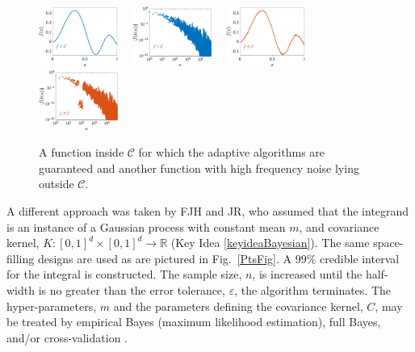 \documentclass[11pt]{NSFamsart}
\newcommand{\reals}{{\mathbb{R}}}
\newcommand{\cc}{\mathcal{C}}
\begin{document}
\begin{figure}[h]
	\centering
	\includegraphics[width = 0.23\textwidth] 
	{ProgramsImages/FunctionWalshFourierCoeffDecay.eps} \ \ 
	\includegraphics[width = 0.23\textwidth] 
	{ProgramsImages/WalshFourierCoeffDecay128.eps} \ \ 
	\includegraphics[width = 0.23\textwidth] 
	{ProgramsImages/FilteredFunctionWalshFourierCoeffDecay.eps} \ \ 
	\includegraphics[width = 0.23\textwidth] 
	{ProgramsImages/WalshFourierCoeffDecayFilter.eps}
	\caption{A function inside $\cc$ for which the adaptive algorithms are guaranteed and another function with high frequency noise lying outside $\cc$.
	\label{GoodBadWalshFig}}
\end{figure}

A different approach was taken by FJH and JR, who assumed that the integrand is an instance of a Gaussian process with constant mean $m$, and covariance kernel, $K:[0,1]^d \times [0,1]^d \to \reals$ (Key Idea \ref{keyideaBayesian}).  The same space-filling designs are used as are pictured in Fig.\ \ref{PtsFig}.  A $99\%$ credible interval for the integral is constructed.  The sample size, $n$, is increased until the half-width is no greater than the error tolerance, $\varepsilon$, the algorithm terminates.  The hyper-parameters, $m$ and the parameters defining the covariance kernel, $C$, may be treated by empirical Bayes (maximum likelihood estimation), full Bayes, and/or cross-validation \cite{RatHic19a}. 
\end{document}
